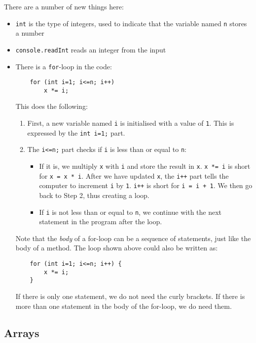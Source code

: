 There are a number of new things here:
\begin{itemize}
	\item \texttt{int} is the type of integers, used to indicate that the variable named \texttt{n} stores a number
	\item \texttt{console.readInt} reads an integer from the input 
	\item There is a \texttt{for}-loop in the code:
	\begin{verbatim}
	for (int i=1; i<=n; i++)
	    x *= i; 
	\end{verbatim}
	This does the following: 
	\begin{enumerate}
		\item First, a new variable named \texttt{i} is initialised with a value of \texttt{1}. This is expressed by the \texttt{int i=1;} part.
		\item The \texttt{i<=n;} part checks if \texttt{i} is less than or equal to \texttt{n}:
		\begin{itemize}
			\item If it is, we multiply \texttt{x} with \texttt{i} and store the result in \texttt{x}. \texttt{x *= i} is short for  \texttt{x = x * i}. After we have updated \texttt{x}, the \texttt{i++} part tells the computer to increment \texttt{i} by \texttt{1}. \texttt{i++} is short for \texttt{i = i + 1}. We then go back to Step 2, thus creating a loop.
			\item If \texttt{i} is not less than or equal to \texttt{n}, we continue with the next statement in the program after the loop.
		\end{itemize}
	\end{enumerate}
	Note that the \emph{body} of a for-loop can be a sequence of statements, just like the body of a method. The loop shown above could also be written as:
	\begin{verbatim}
	for (int i=1; i<=n; i++) {
	    x *= i; 
	}
	\end{verbatim}
	If there is only one statement, we do not need the curly brackets. If there is more than one statement in the body of the for-loop, we do need them.
\end{itemize}

\subsection*{Arrays}

